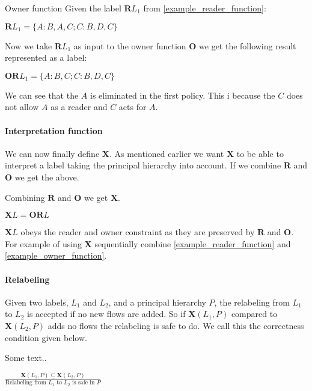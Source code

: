 \begin{example}{Owner function}\label{example_owner_function}
  Given the label $\textbf{R}L_1$ from \cref{example_reader_function}:
  \begin{center}
    $\textbf{R}L_1 = \{A:B,A,C; C:B,D,C\}$
  \end{center}
  Now we take $\textbf{R}L_1$ as input to the owner function $\textbf{O}$ we get the following result represented as a label:
  \begin{center}
    $\textbf{OR}L_1 = \{A:B,C; C:B,D,C\}$
  \end{center}
  We can see that the $A$ is eliminated in the first policy.
  This i because the $C$ does not allow $A$ as a reader and $C$ acts for $A$. 
\end{example}

\paragraph{Interpretation function}
We can now finally define $\textbf{X}$.
As mentioned earlier we want $\textbf{X}$ to be able to interpret a label taking the principal hierarchy into account.
If we combine $\textbf{R}$ and $\textbf{O}$ we get the above.
\begin{definition}
  Combining $\textbf{R}$ and $\textbf{O}$ we get $\textbf{X}$.
  \begin{center}
    $\textbf{X}L = \textbf{OR}L$
  \end{center}
\end{definition}
$\textbf{X}L$ obeys the reader and owner constraint as they are preserved by $\textbf{R}$ and $\textbf{O}$.
For example of using $\textbf{X}$ sequentially combine \cref{example_reader_function} and \cref{example_owner_function}.

\paragraph{Relabeling}
Given two labels, $L_1$ and $L_2$, and a principal hierarchy $P$, the relabeling from $L_1$ to $L_2$ is accepted if no new flows are added.
So if $\textbf{X}(L_1, P)$ compared to $\textbf{X}(L_2, P)$ adds no flows the relabeling is safe to do.
We call this the correctness condition given below.
\begin{definition}
  Some text..
  \begin{center}
    $\frac{\textbf{X}(L_1, P)\subseteq \textbf{X}(L_2,P)}{\text{Relabeling from } L_1 \text{ to } L_2 \text{ is safe in } P }$
  \end{center}
\end{definition}

